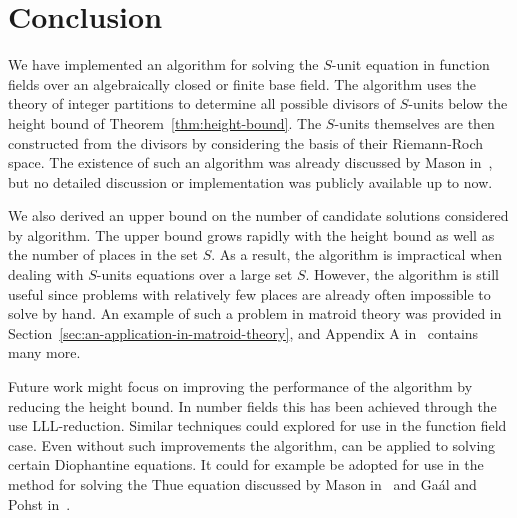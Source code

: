
\chapter{Conclusion}%
\label{chap:conclusion}

We have implemented an algorithm for solving the \(S\)-unit equation in function fields over an algebraically closed or finite base field. The algorithm uses the theory of integer partitions to determine all possible divisors of \(S\)-units below the height bound of Theorem~\ref{thm:height-bound}. The \(S\)-units themselves are then constructed from the divisors by considering the basis of their Riemann-Roch space. The existence of such an algorithm was already discussed by Mason in~\cite{mason-1984-diophantine-equations-over}, but no detailed discussion or implementation was publicly available up to now.

We also derived an upper bound on the number of candidate solutions considered by algorithm. The upper bound grows rapidly with the height bound as well as the number of places in the set \(S\). As a result, the algorithm is impractical when dealing with \(S\)-units equations over a large set \(S\). However, the algorithm is still useful since problems with relatively few places are already often impossible to solve by hand. An example of such a problem in matroid theory was provided in Section~\ref{sec:an-application-in-matroid-theory}, and Appendix A in~\cite{baker-2023-foundations-of-matroids} contains many more.

Future work might focus on improving the performance of the algorithm by reducing the height bound. In number fields this has been achieved through the use LLL-reduction. Similar techniques could explored for use in the function field case. Even without such improvements the algorithm, can be applied to solving certain Diophantine equations. It could for example be adopted for use in the method for solving the Thue equation discussed by Mason in~\cite{mason-1984-diophantine-equations-over} and Ga\'{a}l and Pohst in~\cite{gaal-2006-diophantine-equations-over, gaal-2006-diophantine-equations-overa}.
